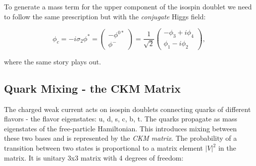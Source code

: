 To generate a mass term for the upper component of the isospin doublet we need to follow the same prescription but with the \textit{conjugate} Higgs field:

\begin{equation}
\phi_{c} = - i \sigma_{2} \phi^{*}
= \begin{pmatrix} -\phi^{0*} \\ \phi^{-} \end{pmatrix} = \frac{1}{\sqrt{2}} \begin{pmatrix} -\phi_{3} + i\phi_{4} \\  \phi_{1} - i \phi_{2} \end{pmatrix},
\end{equation}

where the same story plays out.


\subsection{Quark Mixing - the CKM Matrix}

The charged weak current acts on isospin doublets connecting quarks of different flavors - the flavor eigenstates: u, d, s, c, b, t. The quarks propagate as mass eigenstates of the free-particle Hamiltonian. This introduces mixing between these two bases and is represented by the \textit{CKM matrix}. The probability of a transition between two states is proportional to a matrix element $|V|^{2}$ in the matrix. It is unitary 3x3 matrix with 4 degrees of freedom:

